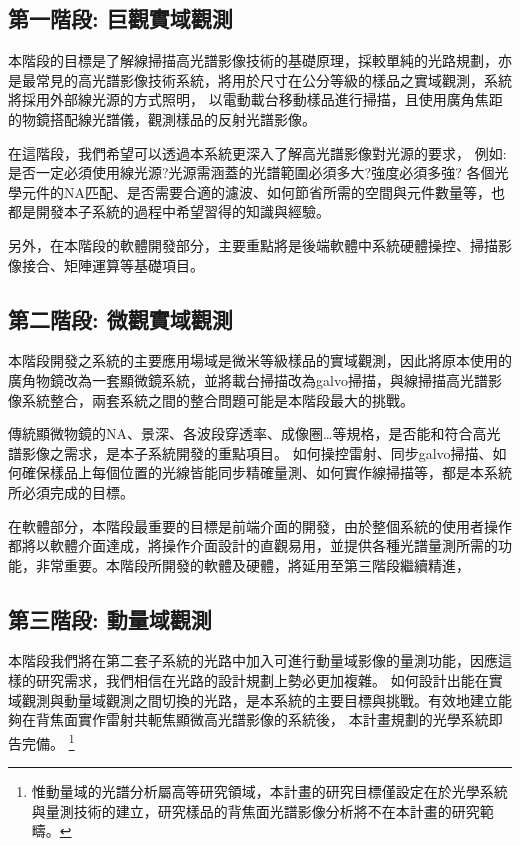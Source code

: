\documentclass[12pt]{article}
\begin{document}
\subsection{第一階段: 巨觀實域觀測} \label{macroreal}
本階段的目標是了解線掃描高光譜影像技術的基礎原理，採較單純的光路規劃，亦是最常見的高光譜影像技術系統，將用於尺寸在公分等級的樣品之實域觀測，系統將採用外部線光源的方式照明，
以電動載台移動樣品進行掃描，且使用廣角焦距的物鏡搭配線光譜儀，觀測樣品的反射光譜影像。

在這階段，我們希望可以透過本系統更深入了解高光譜影像對光源的要求，
例如: 是否一定必須使用線光源?光源需涵蓋的光譜範圍必須多大?強度必須多強?
各個光學元件的NA匹配、是否需要合適的濾波、如何節省所需的空間與元件數量等，也都是開發本子系統的過程中希望習得的知識與經驗。

另外，在本階段的軟體開發部分，主要重點將是後端軟體中系統硬體操控、掃描影像接合、矩陣運算等基礎項目。
\subsection{第二階段: 微觀實域觀測} \label{microreal}
本階段開發之系統的主要應用場域是微米等級樣品的實域觀測，因此將原本使用的廣角物鏡改為一套顯微鏡系統，並將載台掃描改為galvo掃描，與線掃描高光譜影像系統整合，兩套系統之間的整合問題可能是本階段最大的挑戰。

傳統顯微物鏡的NA、景深、各波段穿透率、成像圈\ldots 等規格，是否能和符合高光譜影像之需求，是本子系統開發的重點項目。
如何操控雷射、同步galvo掃描、如何確保樣品上每個位置的光線皆能同步精確量測、如何實作線掃描等，都是本系統所必須完成的目標。

在軟體部分，本階段最重要的目標是前端介面的開發，由於整個系統的使用者操作都將以軟體介面達成，將操作介面設計的直觀易用，並提供各種光譜量測所需的功能，非常重要。本階段所開發的軟體及硬體，將延用至第三階段繼續精進，

\subsection{第三階段: 動量域觀測} \label{momentum}
本階段我們將在第二套子系統的光路中加入可進行動量域影像的量測功能，因應這樣的研究需求，我們相信在光路的設計規劃上勢必更加複雜。
如何設計出能在實域觀測與動量域觀測之間切換的光路，是本系統的主要目標與挑戰。有效地建立能夠在背焦面實作雷射共軛焦顯微高光譜影像的系統後，
本計畫規劃的光學系統即告完備。
\footnote{惟動量域的光譜分析屬高等研究領域，本計畫的研究目標僅設定在於光學系統與量測技術的建立，研究樣品的背焦面光譜影像分析將不在本計畫的研究範疇。}
\end{document}
